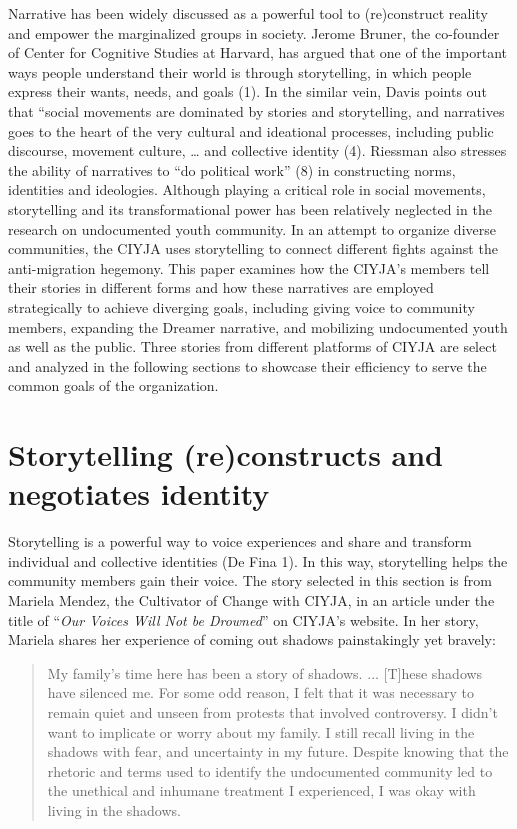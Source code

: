 \documentclass[12pt]{article}
\begin{document}
\begin{flushleft}
Narrative has been widely discussed as a powerful tool to (re)construct reality and empower the marginalized groups in society. 
Jerome Bruner, the co-founder of Center for Cognitive Studies at Harvard, has argued that one of the important ways people understand their world is through storytelling, in which people express their wants, needs, and goals (1). 
In the similar vein, Davis points out that ``social movements are dominated by stories and storytelling, and narratives goes to the heart of the very cultural and ideational processes, including public discourse, movement culture, … and collective identity (4). 
Riessman also stresses the ability of narratives to ``do political work'' (8) in constructing norms, identities and ideologies. 
Although playing a critical role in social movements, storytelling and its transformational power has been relatively neglected in the research on undocumented youth community. 
In an attempt to organize diverse communities, the CIYJA uses storytelling to connect different fights against the anti-migration hegemony. 
This paper examines how the CIYJA's members tell their stories in different forms and how these narratives are employed strategically to achieve diverging goals, including giving voice to community members, expanding the Dreamer narrative, and mobilizing undocumented youth as well as the public. 
Three stories from different platforms of CIYJA are select and analyzed in the following sections to showcase their efficiency to serve the common goals of the organization. 


\section*{Storytelling (re)constructs and negotiates identity}

Storytelling is a powerful way to voice experiences and share and transform individual and collective identities (De Fina 1). 
In this way, storytelling helps the community members gain their voice. The story selected in this section is from Mariela Mendez, the Cultivator of Change with CIYJA, in an article under the title of ``\textit{Our Voices Will Not be Drowned}'' on CIYJA's website. In her story, Mariela shares her experience of coming out shadows painstakingly yet bravely: 

\begin{quotation}
    \noindent
    My family's time here has been a story of shadows. $\ldots$ [T]hese shadows have silenced me.
    For some odd reason, I felt that it was necessary to remain quiet and unseen from protests that involved controversy. 
    I didn't want to implicate or worry about my family.
    I still recall living in the shadows with fear, and uncertainty in my future.
    Despite knowing that the rhetoric and terms used to identify the undocumented community led to the unethical and inhumane treatment I experienced, I was okay with living in the shadows.
\end{quotation} %


\end{flushleft}
\end{document}
